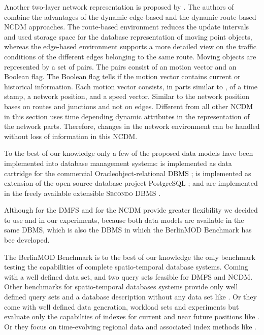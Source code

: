 \documentclass[a4paper]{article}
\newcommand{\secondo}{\textsc{Secondo}}
\newcommand{\bmodb} {BerlinMOD Benchmark}
\begin{document}
Another two-layer network representation is proposed by \cite{DynamicTransportNetworkDing}.
The authors of \cite{DynamicTransportNetworkDing} combine the advantages of the
dynamic edge-based \cite{DynNetworkModEdgeGueting} and the dynamic route-based
\cite{DynNetworkModRouteGueting} NCDM approaches. The route-based environment
reduces the update intervals and used storage space for the database representation
of moving point objects, whereas the edge-based environment supports
a more detailed view on the traffic conditions of the different edges belonging
to the same route. Moving objects are represented by a set of pairs. The pairs
consist of an motion vector and an Boolean flag. The Boolean flag tells if the
motion vector contains current or historical information. Each motion vector
consists, in parts similar to \cite{NetworkJensen}, of a time stamp, a network
position, and a speed vector. Similar to \cite{NetworkGueting} the network
position bases on routes and junctions and not on edges. Different from all
other NCDM in this section \cite{DynamicTransportNetworkDing}
uses time depending dynamic attributes in the representation of the network parts.
Therefore, changes in the network environment can be handled without loss of
information in this NCDM.

To the best of our knowledge only a few of the proposed data models have been
implemented into database management systems: \cite{STAUPelekis} is implemented
as data cartridge \cite{HERMESMDCPelekis, HERMESPelekis} for the commercial
Oracle\textregistered object-relational DBMS \cite{oracle};
\cite{DynamicTransportNetworkDing} is implemented as extension of the open source
database project PostgreSQL \cite{PostgreSQL}; \cite{DataModelDataStructureGueting}
and \cite{NetworkGueting} are implemented in the freely available extensible
\secondo{} DBMS \cite{SecondoPlatformPrototypingGueting}.

Although \cite{STAUPelekis} for the DMFS and \cite{DynamicTransportNetworkDing} for
the NCDM provide greater flexibility we decided to use
\cite{DataModelDataStructureGueting} and \cite{NetworkGueting} in our
experiments, because both data models are available in the same DBMS, which is
also the DBMS in which the \bmodb{} \cite{BerlinMODVLDBDuentgen} has bee developed.

The \bmodb{} \cite{BerlinMODVLDBDuentgen} is to the best of our knowledge the only
benchmark testing the capabilities of complete spatio-temporal database systems.
Coming with a well defined data set, and two query sets feasible for DMFS and NCDM.
Other benchmarks for spatio-temporal databases systems provide only well defined
query sets and a database description without any data set like \cite{QueriesTheodoridis}.
Or they come with well defined data generation, workload sets and experiments but
evaluate only the capabilties of indexes for current and near future positions like
\cite{COSTBenchmarkJensen}. Or they focus on time-evolving regional data and associated
index methods like \cite{BenchmarkTzouramanis}.
\end{document}
